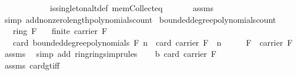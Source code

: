 \begin{isabellebody}
\ \ \ \ \ \ \ \ \ \ \ \ is{\isacharunderscore}{\kern0pt}singleton{\isacharunderscore}{\kern0pt}altdef\ mem{\isacharunderscore}{\kern0pt}Collect{\isacharunderscore}{\kern0pt}eq{\isacharparenright}{\kern0pt}\ \isanewline
\ \ \ \ \isamarkupfalse%
\ assms\ \isamarkupfalse%
\ {\isacharparenleft}{\kern0pt}simp\ add{\isacharcolon}{\kern0pt}nonzero{\isacharunderscore}{\kern0pt}length{\isacharunderscore}{\kern0pt}polynomials{\isacharunderscore}{\kern0pt}count{\isacharparenright}{\kern0pt}\isanewline
{}\isamarkupfalse%
%
\endisatagproof
{\isafoldproof}%
%
\isadelimproof
\isanewline
%
\endisadelimproof
\isanewline
{}\isamarkupfalse%
\ bounded{\isacharunderscore}{\kern0pt}degree{\isacharunderscore}{\kern0pt}polynomials{\isacharunderscore}{\kern0pt}count{\isacharcolon}{\kern0pt}\isanewline
\ \ \ {\isachardoublequoteopen}ring\ F{\isachardoublequoteclose}\isanewline
\ \ \ {\isachardoublequoteopen}finite\ {\isacharparenleft}{\kern0pt}carrier\ F{\isacharparenright}{\kern0pt}{\isachardoublequoteclose}\isanewline
\ \ \ {\isachardoublequoteopen}card\ {\isacharparenleft}{\kern0pt}bounded{\isacharunderscore}{\kern0pt}degree{\isacharunderscore}{\kern0pt}polynomials\ F\ n{\isacharparenright}{\kern0pt}\ {\isacharequal}{\kern0pt}\ card\ {\isacharparenleft}{\kern0pt}carrier\ F{\isacharparenright}{\kern0pt}\ {\isacharcircum}{\kern0pt}\ n{\isachardoublequoteclose}\isanewline
%
\isadelimproof
%
\endisadelimproof
%
\isatagproof
{}\isamarkupfalse%
\ {\isacharminus}{\kern0pt}\isanewline
\ \ \isamarkupfalse%
\ {\isachardoublequoteopen}{\isasymzero}\isactrlbsub F\isactrlesub \ {\isasymin}\ carrier\ F{\isachardoublequoteclose}\ \isamarkupfalse%
\ assms{\isacharparenleft}{\kern0pt}{}{\isacharparenright}{\kern0pt}\ \isamarkupfalse%
\ {\isacharparenleft}{\kern0pt}simp\ add{\isacharcolon}{\kern0pt}\ ring{\isachardot}{\kern0pt}ring{\isacharunderscore}{\kern0pt}simprules{\isacharparenleft}{\kern0pt}{}{\isacharparenright}{\kern0pt}{\isacharparenright}{\kern0pt}\isanewline
\ \ \isamarkupfalse%
\ b{\isacharcolon}{\kern0pt}\ {\isachardoublequoteopen}card\ {\isacharparenleft}{\kern0pt}carrier\ F{\isacharparenright}{\kern0pt}\ {\isachargreater}{\kern0pt}\ {}{\isachardoublequoteclose}\ \isanewline
\ \ \ \ \isamarkupfalse%
\ assms{\isacharparenleft}{\kern0pt}{}{\isacharparenright}{\kern0pt}\ card{\isacharunderscore}{\kern0pt}gt{\isacharunderscore}{\kern0pt}{}{\isacharunderscore}{\kern0pt}iff\ \isamarkupfalse%

\end{isabellebody}
